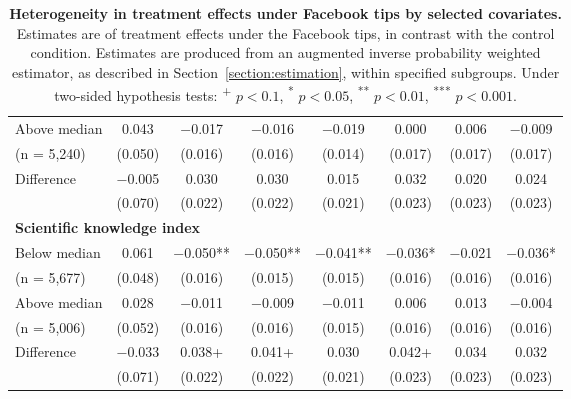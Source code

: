 \documentclass[letterpaper, 12pt, parskip=full,DIV=10]{scrartcl}
\begin{document}
\begin{table}[H]
{\begin{tabular}{lccccccc}
\hspace{1em} Above median	&	\num{0.043}	&	\num{-0.017}	&	\num{-0.016}	&	\num{-0.019}	&	\num{0.000}	&	\num{0.006}	&	\num{-0.009}\\
\hspace{1.5em} (n = 5,240)	&	(\num{0.050})	&	(\num{0.016})	&	(\num{0.016})	&	(\num{0.014})	&	(\num{0.017})	&	(\num{0.017})	&	(\num{0.017})\\
\cmidrule(lr){2-8}														
\hspace{1em} Difference	&	\num{-0.005}	&	\num{0.030}	&	\num{0.030}	&	\num{0.015}	&	\num{0.032}	&	\num{0.020}	&	\num{0.024}\\
\hspace{1.5em}	&	(\num{0.070})	&	(\num{0.022})	&	(\num{0.022})	&	(\num{0.021})	&	(\num{0.023})	&	(\num{0.023})	&	(\num{0.023})\\
\multicolumn{4}{l}{\textbf{Scientific knowledge index }}  \rule{0pt}{1.2\normalbaselineskip}\\														
\hspace{1em}   Below median	&	\num{0.061}	&	\num{-0.050}**	&	\num{-0.050}**	&	\num{-0.041}**	&	\num{-0.036}*	&	\num{-0.021}	&	\num{-0.036}*\\
\hspace{1.5em} (n = 5,677)	&	(\num{0.048})	&	(\num{0.016})	&	(\num{0.015})	&	(\num{0.015})	&	(\num{0.016})	&	(\num{0.016})	&	(\num{0.016})\\
\hspace{1em}   Above median	&	\num{0.028}	&	\num{-0.011}	&	\num{-0.009}	&	\num{-0.011}	&	\num{0.006}	&	\num{0.013}	&	\num{-0.004}\\
\hspace{1.5em}  (n = 5,006)	&	(\num{0.052})	&	(\num{0.016})	&	(\num{0.016})	&	(\num{0.015})	&	(\num{0.016})	&	(\num{0.016})	&	(\num{0.016})\\
\cmidrule(lr){2-8}														
\hspace{1em}   Difference	&	\num{-0.033}	&	\num{0.038}+	&	\num{0.041}+	&	\num{0.030}	&	\num{0.042}+	&	\num{0.034}	&	\num{0.032}\\
\hspace{1.5em}	&	(\num{0.071})	&	(\num{0.022})	&	(\num{0.022})	&	(\num{0.021})	&	(\num{0.023})	&	(\num{0.023})	&	(\num{0.023})\\
    \end{tabular}
   }
   \caption{\textbf{Heterogeneity in treatment effects under Facebook tips by selected covariates.} Estimates are of treatment effects under the Facebook tips, in contrast with the control condition. Estimates are produced from an augmented inverse probability weighted estimator, as described in Section~\ref{section:estimation}, within specified subgroups. Under two-sided hypothesis tests: \textsuperscript{+} $p<0.1$, \textsuperscript{*} $p < 0.05$, \textsuperscript{**} $p < 0.01$, \textsuperscript{***} $p < 0.001$.}
  \label{tab:heterogeneity_treatment_facebook}
\end{table}

\end{document}
